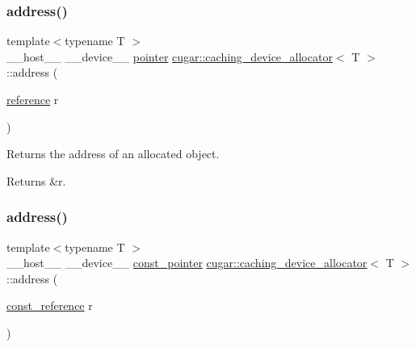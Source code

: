 \subsubsection{\texorpdfstring{address()}{address()}\hspace{0.1cm}{\footnotesize\ttfamily [1/2]}}
{\footnotesize\ttfamily template$<$typename T $>$ \\
\+\_\+\+\_\+host\+\_\+\+\_\+ \+\_\+\+\_\+device\+\_\+\+\_\+ \hyperlink{structcugar_1_1caching__device__allocator_a442ab01357a3851bb0e9f17c5e49fce3}{pointer} \hyperlink{structcugar_1_1caching__device__allocator}{cugar\+::caching\+\_\+device\+\_\+allocator}$<$ T $>$\+::address (\begin{DoxyParamCaption}\item[{\hyperlink{structcugar_1_1caching__device__allocator_a13eca6cad4c022bd791efb73d64adb8a}{reference}}]{r }\end{DoxyParamCaption})\hspace{0.3cm}{\ttfamily [inline]}}

Returns the address of an allocated object. \begin{DoxyReturn}{Returns}
{\ttfamily \&r}. 
\end{DoxyReturn}
\mbox{\label{structcugar_1_1caching__device__allocator_a1606cb57752f8d670abf7b1f37e59ce3}} 
\subsubsection{\texorpdfstring{address()}{address()}\hspace{0.1cm}{\footnotesize\ttfamily [2/2]}}
{\footnotesize\ttfamily template$<$typename T $>$ \\
\+\_\+\+\_\+host\+\_\+\+\_\+ \+\_\+\+\_\+device\+\_\+\+\_\+ \hyperlink{structcugar_1_1caching__device__allocator_a56ae6e43547f283ab330befe1643e3dd}{const\+\_\+pointer} \hyperlink{structcugar_1_1caching__device__allocator}{cugar\+::caching\+\_\+device\+\_\+allocator}$<$ T $>$\+::address (\begin{DoxyParamCaption}\item[{\hyperlink{structcugar_1_1caching__device__allocator_a1c9ffc95bc3d45eb753113428c362aa6}{const\+\_\+reference}}]{r }\end{DoxyParamCaption})\hspace{0.3cm}{\ttfamily [inline]}}

